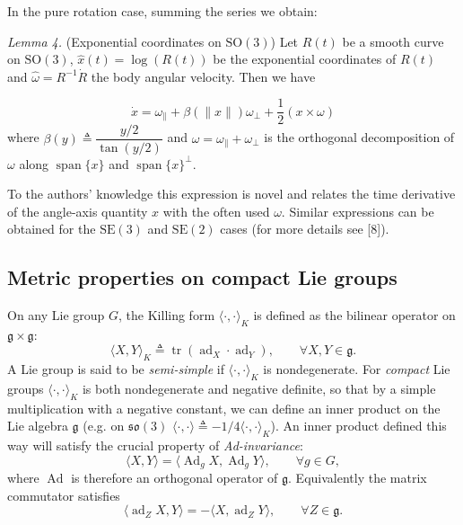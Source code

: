 \documentclass[10pt,twocolumn]{article}
\newcommand{\SO}{\mathrm{SO}}
\newcommand{\SE}{\mathrm{SE}}
\newcommand{\so}{\mathfrak{so}}
\newcommand{\gfrak}{\mathfrak g}
\newcommand{\Ad}{\operatorname{Ad}}
\newcommand{\ad}{\operatorname{ad}}
\newcommand{\tr}{\operatorname{tr}}
\newcommand{\paperhead}[2]{\par\medskip\noindent\textit{#1} #2\par}
\begin{document}
In the pure rotation case, summing the series we obtain:

\paperhead{Lemma 4.}{(Exponential coordinates on $\SO(3)$) Let $R(t)$ be a smooth curve on $\SO(3)$, $\widehat{x}(t)=\log(R(t))$ be the exponential coordinates of $R(t)$ and $\widehat\omega=R^{-1}\dot R$ the body angular velocity. Then we have}
\begin{equation*}
\dot x=\omega_{\parallel}+\beta(\|x\|)\omega_{\perp}+\frac12(x\times\omega)
\end{equation*}
where $\beta(y)\triangleq\dfrac{y/2}{\tan(y/2)}$ and $\omega=\omega_{\parallel}+\omega_{\perp}$ is the orthogonal decomposition of $\omega$ along $\operatorname{span}\{x\}$ and $\operatorname{span}\{x\}^{\perp}$.

To the authors' knowledge this expression is novel and relates the time derivative of the angle-axis quantity $x$ with the often used $\omega$. Similar expressions can be obtained for the $\SE(3)$ and $\SE(2)$ cases (for more details see [8]).

\subsection{Metric properties on compact Lie groups}
On any Lie group $G$, the Killing form $\langle\cdot,\cdot\rangle_K$ is defined as the bilinear operator on $\gfrak\times\gfrak$:
\begin{equation*}
\langle X,Y\rangle_K\triangleq\tr(\ad_X\cdot\ad_Y),\qquad \forall X,Y\in\gfrak.
\end{equation*}
A Lie group is said to be \emph{semi-simple} if $\langle\cdot,\cdot\rangle_K$ is nondegenerate. For \emph{compact} Lie groups $\langle\cdot,\cdot\rangle_K$ is both nondegenerate and negative definite, so that by a simple multiplication with a negative constant, we can define an inner product on the Lie algebra $\gfrak$ (e.g. on $\so(3)$ $\langle\cdot,\cdot\rangle\triangleq-1/4\langle\cdot,\cdot\rangle_K$). An inner product defined this way will satisfy the crucial property of \emph{Ad-invariance}:
\begin{equation*}
\langle X,Y\rangle=\langle\Ad_gX,\Ad_gY\rangle,\qquad \forall g\in G,
\end{equation*}
where $\Ad$ is therefore an orthogonal operator of $\gfrak$. Equivalently the matrix commutator satisfies
\begin{equation*}
\langle\ad_ZX,Y\rangle=-\langle X,\ad_ZY\rangle,
\qquad \forall Z\in\gfrak.\tag{2}
\end{equation*}
\end{document}
